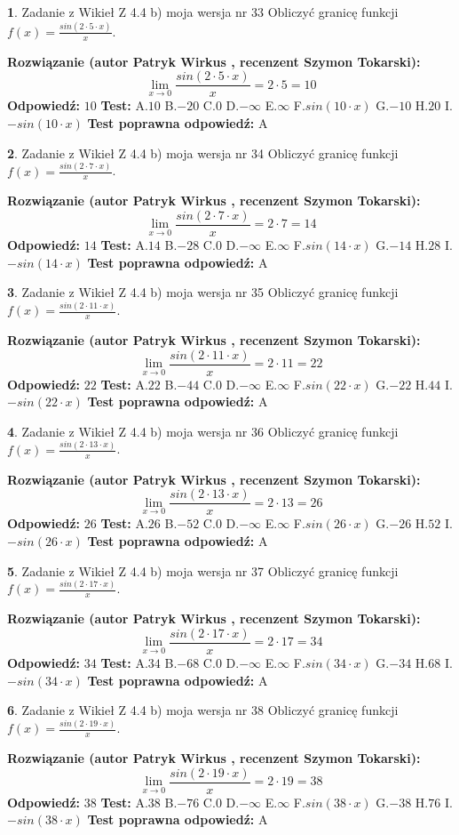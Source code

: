 \documentclass[12pt, a4paper]{article}
\theoremstyle{definition} %
\newtheorem{zad}{}
\newcommand{\zadStart}[1]{\begin{zad}#1\newline}
\newcommand{\zadStop}{\end{zad}}
\newcommand{\rozwStart}[2]{\noindent \textbf{Rozwiązanie (autor #1 , recenzent #2): }\newline}
\newcommand{\rozwStop}{\newline}
\newcommand{\odpStart}{\noindent \textbf{Odpowiedź:}\newline}
\newcommand{\odpStop}{\newline}
\newcommand{\testStart}{\noindent \textbf{Test:}\newline}
\newcommand{\testStop}{\newline}
\newcommand{\kluczStart}{\noindent \textbf{Test poprawna odpowiedź:}\newline}
\newcommand{\kluczStop}{\newline}
\begin{document}
\zadStart{Zadanie z Wikieł Z 4.4 b) moja wersja nr 33}
Obliczyć granicę funkcji $f(x)=\frac{sin(2 \cdot5\cdot x)}{x}$.
\zadStop
\rozwStart{Patryk Wirkus}{Szymon Tokarski}
$$\lim\limits_{x\to 0}\frac{sin(2 \cdot 5\cdot x)}{x}=
2 \cdot 5 = 10$$
\rozwStop
\odpStart
$10$
\odpStop
\testStart
A.$10$
B.$-20$
C.$0$
D.$-\infty$
E.$\infty$
F.$sin(10\cdot x)$
G.$-10$
H.$20$
I.$-sin(10\cdot x)$
\testStop
\kluczStart
A
\kluczStop



\zadStart{Zadanie z Wikieł Z 4.4 b) moja wersja nr 34}
Obliczyć granicę funkcji $f(x)=\frac{sin(2 \cdot7\cdot x)}{x}$.
\zadStop
\rozwStart{Patryk Wirkus}{Szymon Tokarski}
$$\lim\limits_{x\to 0}\frac{sin(2 \cdot 7\cdot x)}{x}=
2 \cdot 7 = 14$$
\rozwStop
\odpStart
$14$
\odpStop
\testStart
A.$14$
B.$-28$
C.$0$
D.$-\infty$
E.$\infty$
F.$sin(14\cdot x)$
G.$-14$
H.$28$
I.$-sin(14\cdot x)$
\testStop
\kluczStart
A
\kluczStop



\zadStart{Zadanie z Wikieł Z 4.4 b) moja wersja nr 35}
Obliczyć granicę funkcji $f(x)=\frac{sin(2 \cdot11\cdot x)}{x}$.
\zadStop
\rozwStart{Patryk Wirkus}{Szymon Tokarski}
$$\lim\limits_{x\to 0}\frac{sin(2 \cdot 11\cdot x)}{x}=
2 \cdot 11 = 22$$
\rozwStop
\odpStart
$22$
\odpStop
\testStart
A.$22$
B.$-44$
C.$0$
D.$-\infty$
E.$\infty$
F.$sin(22\cdot x)$
G.$-22$
H.$44$
I.$-sin(22\cdot x)$
\testStop
\kluczStart
A
\kluczStop



\zadStart{Zadanie z Wikieł Z 4.4 b) moja wersja nr 36}
Obliczyć granicę funkcji $f(x)=\frac{sin(2 \cdot13\cdot x)}{x}$.
\zadStop
\rozwStart{Patryk Wirkus}{Szymon Tokarski}
$$\lim\limits_{x\to 0}\frac{sin(2 \cdot 13\cdot x)}{x}=
2 \cdot 13 = 26$$
\rozwStop
\odpStart
$26$
\odpStop
\testStart
A.$26$
B.$-52$
C.$0$
D.$-\infty$
E.$\infty$
F.$sin(26\cdot x)$
G.$-26$
H.$52$
I.$-sin(26\cdot x)$
\testStop
\kluczStart
A
\kluczStop



\zadStart{Zadanie z Wikieł Z 4.4 b) moja wersja nr 37}
Obliczyć granicę funkcji $f(x)=\frac{sin(2 \cdot17\cdot x)}{x}$.
\zadStop
\rozwStart{Patryk Wirkus}{Szymon Tokarski}
$$\lim\limits_{x\to 0}\frac{sin(2 \cdot 17\cdot x)}{x}=
2 \cdot 17 = 34$$
\rozwStop
\odpStart
$34$
\odpStop
\testStart
A.$34$
B.$-68$
C.$0$
D.$-\infty$
E.$\infty$
F.$sin(34\cdot x)$
G.$-34$
H.$68$
I.$-sin(34\cdot x)$
\testStop
\kluczStart
A
\kluczStop



\zadStart{Zadanie z Wikieł Z 4.4 b) moja wersja nr 38}
Obliczyć granicę funkcji $f(x)=\frac{sin(2 \cdot19\cdot x)}{x}$.
\zadStop
\rozwStart{Patryk Wirkus}{Szymon Tokarski}
$$\lim\limits_{x\to 0}\frac{sin(2 \cdot 19\cdot x)}{x}=
2 \cdot 19 = 38$$
\rozwStop
\odpStart
$38$
\odpStop
\testStart
A.$38$
B.$-76$
C.$0$
D.$-\infty$
E.$\infty$
F.$sin(38\cdot x)$
G.$-38$
H.$76$
I.$-sin(38\cdot x)$
\testStop
\kluczStart
A
\kluczStop
\end{document}
